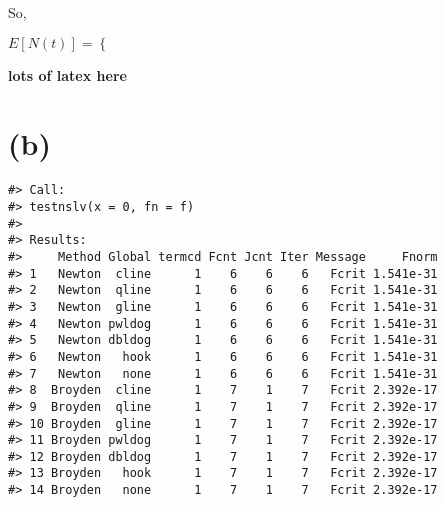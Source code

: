 \documentclass[]{article}
\begin{document}
So,

\(E[N(t)] = \begin{cases} \end{cases}\)

\textbf{lots of latex here}

\hypertarget{b}{%
\section{(b)}\label{b}}

\begin{verbatim}
#> Call:
#> testnslv(x = 0, fn = f)
#> 
#> Results:
#>     Method Global termcd Fcnt Jcnt Iter Message     Fnorm
#> 1   Newton  cline      1    6    6    6   Fcrit 1.541e-31
#> 2   Newton  qline      1    6    6    6   Fcrit 1.541e-31
#> 3   Newton  gline      1    6    6    6   Fcrit 1.541e-31
#> 4   Newton pwldog      1    6    6    6   Fcrit 1.541e-31
#> 5   Newton dbldog      1    6    6    6   Fcrit 1.541e-31
#> 6   Newton   hook      1    6    6    6   Fcrit 1.541e-31
#> 7   Newton   none      1    6    6    6   Fcrit 1.541e-31
#> 8  Broyden  cline      1    7    1    7   Fcrit 2.392e-17
#> 9  Broyden  qline      1    7    1    7   Fcrit 2.392e-17
#> 10 Broyden  gline      1    7    1    7   Fcrit 2.392e-17
#> 11 Broyden pwldog      1    7    1    7   Fcrit 2.392e-17
#> 12 Broyden dbldog      1    7    1    7   Fcrit 2.392e-17
#> 13 Broyden   hook      1    7    1    7   Fcrit 2.392e-17
#> 14 Broyden   none      1    7    1    7   Fcrit 2.392e-17
\end{verbatim}
\end{document}
